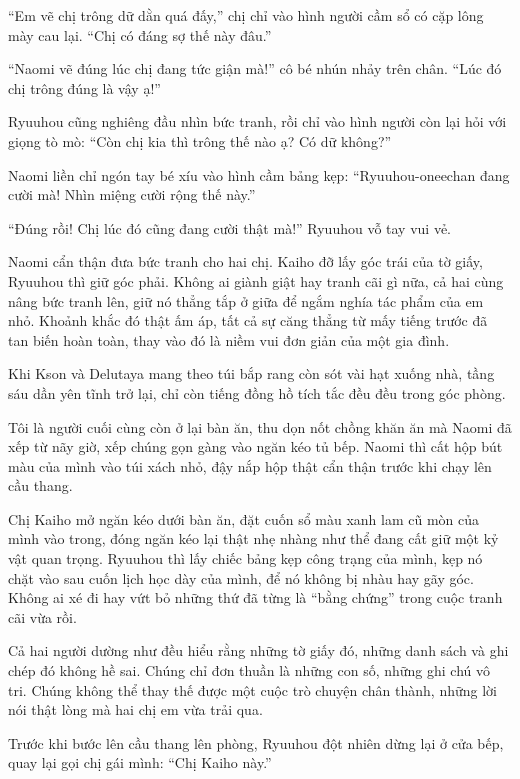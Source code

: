 \documentclass[../main.tex]{subfiles}
\begin{document}
``Em vẽ chị trông dữ dằn quá đấy,'' chị chỉ vào hình người cầm sổ có cặp lông mày cau lại. ``Chị có đáng sợ thế này đâu.''

``Naomi vẽ đúng lúc chị đang tức giận mà!'' cô bé nhún nhảy trên chân. ``Lúc đó chị trông đúng là vậy ạ!''

Ryuuhou cũng nghiêng đầu nhìn bức tranh, rồi chỉ vào hình người còn lại hỏi với giọng tò mò: ``Còn chị kia thì trông thế nào ạ? Có dữ không?''

Naomi liền chỉ ngón tay bé xíu vào hình cầm bảng kẹp: ``Ryuuhou-oneechan đang cười mà! Nhìn miệng cười rộng thế này.''

``Đúng rồi! Chị lúc đó cũng đang cười thật mà!'' Ryuuhou vỗ tay vui vẻ.

Naomi cẩn thận đưa bức tranh cho hai chị. Kaiho đỡ lấy góc trái của tờ giấy, Ryuuhou thì giữ góc phải. Không ai giành giật hay tranh cãi gì nữa, cả hai cùng nâng bức tranh lên, giữ nó thẳng tắp ở giữa để ngắm nghía tác phẩm của em nhỏ. Khoảnh khắc đó thật ấm áp, tất cả sự căng thẳng từ mấy tiếng trước đã tan biến hoàn toàn, thay vào đó là niềm vui đơn giản của một gia đình.

\ct

Khi Kson và Delutaya mang theo túi bắp rang còn sót vài hạt xuống nhà, tầng sáu dần yên tĩnh trở lại, chỉ còn tiếng đồng hồ tích tắc đều đều trong góc phòng.

Tôi là người cuối cùng còn ở lại bàn ăn, thu dọn nốt chồng khăn ăn mà Naomi đã xếp từ nãy giờ, xếp chúng gọn gàng vào ngăn kéo tủ bếp. Naomi thì cất hộp bút màu của mình vào túi xách nhỏ, đậy nắp hộp thật cẩn thận trước khi chạy lên cầu thang.

Chị Kaiho mở ngăn kéo dưới bàn ăn, đặt cuốn sổ màu xanh lam cũ mòn của mình vào trong, đóng ngăn kéo lại thật nhẹ nhàng như thể đang cất giữ một kỷ vật quan trọng. Ryuuhou thì lấy chiếc bảng kẹp công trạng của mình, kẹp nó chặt vào sau cuốn lịch học dày của mình, để nó không bị nhàu hay gãy góc. Không ai xé đi hay vứt bỏ những thứ đã từng là ``bằng chứng'' trong cuộc tranh cãi vừa rồi.

Cả hai người dường như đều hiểu rằng những tờ giấy đó, những danh sách và ghi chép đó không hề sai. Chúng chỉ đơn thuần là những con số, những ghi chú vô tri. Chúng không thể thay thế được một cuộc trò chuyện chân thành, những lời nói thật lòng mà hai chị em vừa trải qua.

Trước khi bước lên cầu thang lên phòng, Ryuuhou đột nhiên dừng lại ở cửa bếp, quay lại gọi chị gái mình: ``Chị Kaiho này.''
\end{document}
